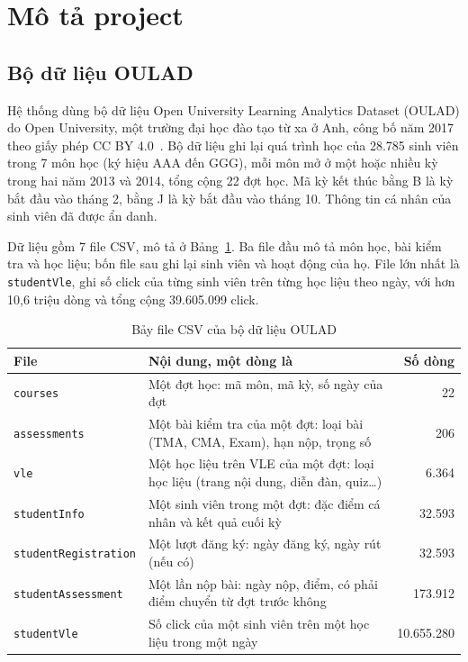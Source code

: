 \section{Mô tả project}
\label{sec:mo-ta}

\subsection{Bộ dữ liệu OULAD}
\label{sec:nguon-du-lieu}
Hệ thống dùng bộ dữ liệu Open University Learning Analytics Dataset (OULAD) do Open
University, một trường đại học đào tạo từ xa ở Anh, công bố năm 2017 theo giấy phép
CC BY 4.0~\cite{kuzilek2017oulad,oulad_dataset}. Bộ dữ liệu ghi lại quá trình học của 28.785 sinh viên
trong 7 môn học (ký hiệu AAA đến GGG), mỗi môn mở ở một hoặc nhiều kỳ trong hai năm 2013 và
2014, tổng cộng 22 đợt học. Mã kỳ kết thúc bằng B là kỳ bắt đầu vào tháng 2, bằng J là kỳ
bắt đầu vào tháng 10. Thông tin cá nhân của sinh viên đã được ẩn danh.

Dữ liệu gồm 7 file CSV, mô tả ở Bảng~\ref{tab:file-nguon}. Ba file đầu mô tả môn học, bài
kiểm tra và học liệu; bốn file sau ghi lại sinh viên và hoạt động của họ. File lớn nhất là
\texttt{studentVle}, ghi số click của từng sinh viên trên từng học liệu theo ngày, với hơn
10,6 triệu dòng và tổng cộng 39.605.099 click.

\begin{table}[htbp]
\centering
\small
\begin{tabularx}{\textwidth}{|l|X|r|}
\hline
\textbf{File} & \textbf{Nội dung, một dòng là} & \textbf{Số dòng} \\ \hline
\texttt{courses} & Một đợt học: mã môn, mã kỳ, số ngày của đợt & 22 \\ \hline
\texttt{assessments} & Một bài kiểm tra của một đợt: loại bài (TMA, CMA, Exam), hạn nộp, trọng số & 206 \\ \hline
\texttt{vle} & Một học liệu trên VLE của một đợt: loại học liệu (trang nội dung, diễn đàn, quiz\ldots) & 6.364 \\ \hline
\texttt{studentInfo} & Một sinh viên trong một đợt: đặc điểm cá nhân và kết quả cuối kỳ & 32.593 \\ \hline
\texttt{studentRegistration} & Một lượt đăng ký: ngày đăng ký, ngày rút (nếu có) & 32.593 \\ \hline
\texttt{studentAssessment} & Một lần nộp bài: ngày nộp, điểm, có phải điểm chuyển từ đợt trước không & 173.912 \\ \hline
\texttt{studentVle} & Số click của một sinh viên trên một học liệu trong một ngày & 10.655.280 \\ \hline
\end{tabularx}
\caption{Bảy file CSV của bộ dữ liệu OULAD}
\label{tab:file-nguon}
\end{table}

